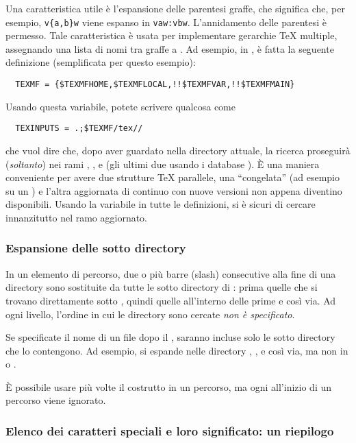 \documentclass{article}
\begin{document}
Una caratteristica utile è l'espansione delle parentesi graffe, che
significa che, per esempio, \verb+v{a,b}w+ viene espanso in
\verb+vaw:vbw+. L'annidamento delle parentesi è permesso. Tale
caratteristica è usata per implementare gerarchie \TeX{} multiple,
assegnando una lista di nomi tra graffe a . Ad esempio, in
, è fatta la seguente definizione (semplificata per questo
esempio):
\begin{verbatim}
  TEXMF = {$TEXMFHOME,$TEXMFLOCAL,!!$TEXMFVAR,!!$TEXMFMAIN}
\end{verbatim}
Usando questa variabile, potete scrivere qualcosa come
\begin{verbatim}
  TEXINPUTS = .;$TEXMF/tex//
\end{verbatim}
che vuol dire che, dopo aver guardato nella directory attuale, la ricerca
proseguirà (\emph{soltanto}) nei rami ,
,  e 
(gli ultimi due usando i database ). È una maniera conveniente
per avere due strutture \TeX{} parallele, una ``congelata'' (ad
esempio su un \CD) e l'altra aggiornata di continuo con nuove versioni non
appena diventino disponibili. Usando la variabile  in tutte
le definizioni, si è sicuri di cercare innanzitutto nel ramo
aggiornato.

\subsubsection{Espansione delle sotto directory}
\label{sec:subdirectory-expansion}

In un elemento di percorso, due o più barre (slash) consecutive alla fine
di una directory  sono sostituite da tutte le sotto directory di
: prima quelle che si trovano direttamente sotto , quindi
quelle all'interno delle prime e così via. Ad ogni livello, l'ordine in
cui le directory sono cercate \emph{non è specificato}.

Se specificate il nome di un file dopo il \samp{//}, saranno incluse solo
le sotto directory che lo contengono. Ad esempio,  si
espande nelle directory , ,  e
così via, ma non in  o .

È possibile usare più volte il costrutto \samp{//} in un percorso, ma ogni
\samp{//} all'inizio di un percorso viene ignorato.

\subsubsection{Elenco dei caratteri speciali e loro significato: un
  riepilogo}
\end{document}
